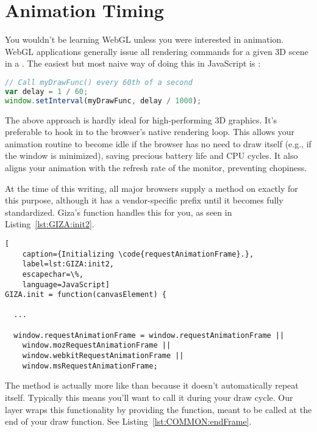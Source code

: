 \section{Animation Timing}

You wouldn't be learning WebGL unless you were interested in animation.  WebGL applications generally issue all rendering commands for a given 3D scene in a .  The easiest but most naive way of doing this in JavaScript is :

\begin{lstlisting}[language=JavaScript]
// Call myDrawFunc() every 60th of a second
var delay = 1 / 60;
window.setInterval(myDrawFunc, delay / 1000);
\end{lstlisting}

The above approach is hardly ideal for high-performing 3D graphics.  It's preferable to hook in to the browser's native rendering loop.  This allows your animation routine to become idle if the browser has no need to draw itself (e.g., if the window is minimized), saving precious battery life and CPU cycles.  It also aligns your animation with the refresh rate of the monitor, preventing chopiness.

At the time of this writing, all major browsers supply a method on  exactly for this purpose, although it has a vendor-specific prefix until it becomes fully standardized.  Giza's  function handles this for you, as seen in Listing~\ref{lst:GIZA:init2}.

\begin{lstlisting}[
    caption={Initializing \code{requestAnimationFrame}.},
    label=lst:GIZA:init2,
    escapechar=\%,
    language=JavaScript]
GIZA.init = function(canvasElement) {

  ...

  window.requestAnimationFrame = window.requestAnimationFrame ||
    window.mozRequestAnimationFrame ||
    window.webkitRequestAnimationFrame ||
    window.msRequestAnimationFrame;
\end{lstlisting} 

The  method is actually more like  than  because it doesn't automatically repeat itself.  Typically this means you'll want to call it during your draw cycle.  Our  layer wraps this functionality by providing the  function, meant to be called at the end of your draw function. See Listing~\ref{lst:COMMON:endFrame}.

